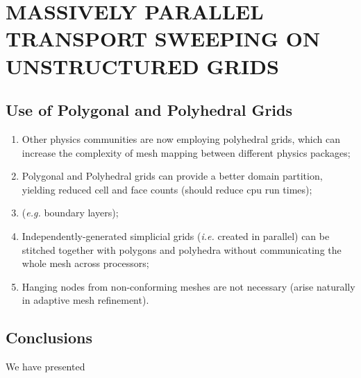 %
%
%
\chapter{\uppercase{Massively Parallel Transport Sweeping on Unstructured Grids}}


\section{Use of Polygonal and Polyhedral Grids}
\label{sec::Sweeps_Poly_Grids}

\begin{enumerate}
	\item Other physics communities are now employing polyhedral grids, which can increase the complexity of mesh mapping between different physics packages;
	\item Polygonal and Polyhedral grids can provide a better domain partition, yielding reduced cell and face counts (should reduce cpu run times);
	\item ({\em e.g.} boundary layers);
	\item Independently-generated simplicial grids ({\em i.e.} created in parallel) can be stitched together with polygons and polyhedra without communicating the whole mesh across processors;
	\item Hanging nodes from non-conforming meshes are not necessary (arise naturally in adaptive mesh refinement).
\end{enumerate}



\section{Conclusions}
\label{sec::Sweeps_Conclusions}

We have presented
